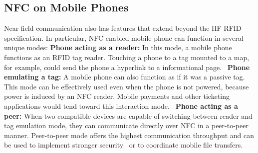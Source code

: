 \documentclass{sig-alternate}
\begin{document}
\subsection{NFC on Mobile Phones}
\label{sec:nfcOnPhones}
Near field communication also has features that extend beyond the HF RFID specification. In particular, NFC enabled mobile phone can function in several unique modes:
\vspace{2mm}\newline
\textbf{Phone acting as a reader:}
In this mode, a mobile phone functions as an RFID tag reader. Touching a phone to a tag mounted to a map, for example, could send the phone a hyperlink to a informational page.~\cite{staticDynamicDisplays} 
\vspace{2mm}\newline
\textbf{Phone emulating a tag:}
A mobile phone can also function as if it was a passive tag. This mode can be effectively used even when the phone is not powered, because power is induced by an NFC reader. Mobile payments and other ticketing applications would tend toward this interaction mode.~\cite{Gum2013}
\vspace{2mm}\newline
\textbf{Phone acting as a peer:}
When two compatible devices are capable of switching between reader and tag emulation mode, they can communicate directly over NFC in a peer-to-peer manner. Peer-to-peer mode offers the highest communication throughput and can be used to implement stronger security~\cite{Ticket2011} or to coordinate mobile file transfers.~\cite{Gum2013}
\end{document}
